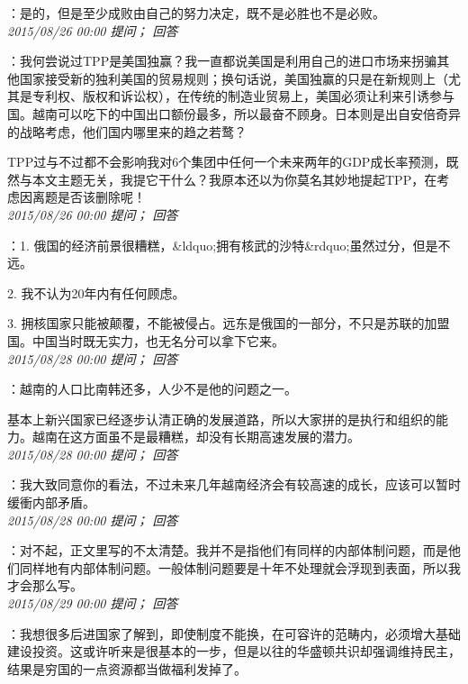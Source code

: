 \documentclass[twocolumn]{ctexart}
\begin{document}
：是的，但是至少成败由自己的努力决定，既不是必胜也不是必败。\\

\textit{\hfill\noindent\small 2015/08/26 00:00 提问； 回答}

：我何尝说过TPP是美国独赢？我一直都说美国是利用自己的进口市场来拐骗其他国家接受新的独利美国的贸易规则；换句话说，美国独赢的只是在新规则上（尤其是专利权、版权和诉讼权），在传统的制造业贸易上，美国必须让利来引诱参与国。越南可以吃下的中国出口额份最多，所以最奋不顾身。日本则是出自安倍奇异的战略考虑，他们国内哪里来的趋之若鹜？

TPP过与不过都不会影响我对6个集团中任何一个未来两年的GDP成长率预测，既然与本文主题无关，我提它干什么？我原本还以为你莫名其妙地提起TPP，在考虑因离题是否该删除呢！\\

\textit{\hfill\noindent\small 2015/08/26 00:00 提问； 回答}

：1. 俄国的经济前景很糟糕，\&ldquo;拥有核武的沙特\&rdquo;虽然过分，但是不远。

2. 我不认为20年内有任何顾虑。

3. 拥核国家只能被颠覆，不能被侵占。远东是俄国的一部分，不只是苏联的加盟国。中国当时既无实力，也无名分可以拿下它来。\\

\textit{\hfill\noindent\small 2015/08/28 00:00 提问； 回答}

：越南的人口比南韩还多，人少不是他的问题之一。

基本上新兴国家已经逐步认清正确的发展道路，所以大家拼的是执行和组织的能力。越南在这方面虽不是最糟糕，却没有长期高速发展的潜力。\\

\textit{\hfill\noindent\small 2015/08/28 00:00 提问； 回答}

：我大致同意你的看法，不过未来几年越南经济会有较高速的成长，应该可以暂时缓衝内部矛盾。\\

\textit{\hfill\noindent\small 2015/08/28 00:00 提问； 回答}

：对不起，正文里写的不太清楚。我并不是指他们有同样的内部体制问题，而是他们同样地有内部体制问题。一般体制问题要是十年不处理就会浮现到表面，所以我才会那么写。\\

\textit{\hfill\noindent\small 2015/08/29 00:00 提问； 回答}

：我想很多后进国家了解到，即使制度不能换，在可容许的范畴内，必须增大基础建设投资。这或许听来是很基本的一步，但是以往的华盛顿共识却强调维持民主，结果是穷国的一点资源都当做福利发掉了。
\end{document}
